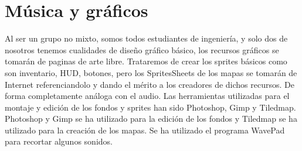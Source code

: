 \section{Música y gráficos}
Al ser un grupo no mixto, somos todos estudiantes de ingeniería, y solo dos de nosotros tenemos cualidades de diseño gráfico básico, los recursos gráficos se tomarán de paginas de arte libre. Trataremos de crear los sprites básicos como son inventario, HUD, botones, pero los SpritesSheets de los mapas se tomarán de Internet referenciandolo y dando el mérito a los creadores de dichos recursos. De forma completamente análoga con el audio.\newline
\newline
Las herramientas utilizadas para el montaje y edición de los fondos y sprites han sido Photoshop, Gimp y Tiledmap. Photoshop y Gimp se ha utilizado para la edición de los fondos y Tiledmap se ha utilizado para la creación de los mapas. Se ha utilizado el programa WavePad para recortar algunos sonidos.



